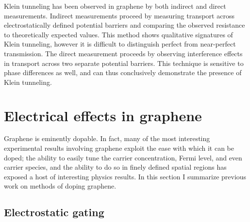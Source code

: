 \documentclass[edeposit,fullpage,draftthesis]{uiucthesis2009}
\begin{document}
        Klein tunneling has been observed in graphene
        by both indirect \cite{Huard2007, stander2009evidence} and direct \cite{young2009quantum} measurements. 
        Indirect measurements proceed by measuring transport across electrostatically 
        defined potential barriers and comparing
        the observed resistance to theoretically expected values. This method shows qualitative
        signatures of Klein tunneling, however it is difficult to distinguish perfect from near-perfect
        transmission. The direct measurement proceeds by observing interference effects in transport
        across two separate potential barriers. This technique is sensitive to phase differences as
        well, and can thus conclusively demonstrate the presence of Klein tunneling.
        
        
    \section{Electrical effects in graphene}
    
        Graphene is eminently dopable. In fact, many of the most interesting experimental
        results involving graphene exploit the ease with which it can be doped; the 
        ability to easily tune the carrier concentration, Fermi level, and even carrier
        species, and the ability to do so in finely defined spatial regions has exposed
        a host of interesting physics results. In this section I summarize previous work
        on methods of doping graphene.
        
        \subsection{Electrostatic gating}
        \label{sec:bg:gating}
      
\end{document}
